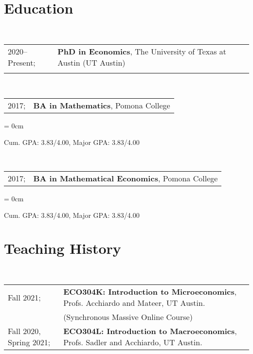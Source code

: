 \documentclass[a4paper, 11pt]{article}
\begin{document}
  \maketitle
  \thispagestyle{firststyle}
      
  \section{Education}
  ~\begin{tabular}{ll}
    2020--Present; & \textbf{PhD in Economics}, The University of Texas at Austin (UT Austin)\\
    \vspace*{-0.50em}
  \end{tabular}

  ~\begin{tabular}{ll}
    2017; & \textbf{BA in Mathematics}, Pomona College\\
  \end{tabular}
  \begin{compactitem}\parskip = 0cm
    \item Cum. GPA: 3.83/4.00, Major GPA: 3.83/4.00\\
  \end{compactitem}
  \vspace*{1em}
      
  ~\begin{tabular}{ll}
    2017; & \textbf{BA in Mathematical Economics}, Pomona College\\
  \end{tabular}
  \begin{compactitem}\parskip = 0cm
    \item Cum. GPA: 3.83/4.00, Major GPA: 3.83/4.00\\
  \end{compactitem}

  \section{Teaching History}
  ~\begin{tabular}{ll}
    Fall 2021; & \textbf{ECO304K: Introduction to Microeconomics}, Profs. Acchiardo and Mateer, UT Austin.\\
    & (Synchronous Massive Online Course)\\
    Fall 2020, Spring 2021; & \textbf{ECO304L: Introduction to Macroeconomics}, Profs. Sadler and Acchiardo, UT Austin.\\
  \end{tabular}
    
\end{document}
